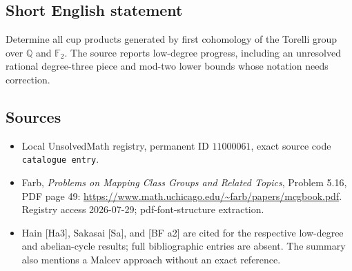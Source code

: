 \documentclass[11pt]{article}
\newcommand{\Q}{\mathbb{Q}}
\newcommand{\F}{\mathbb{F}}
\begin{document}
\subsection{Short English statement}
Determine all cup products generated by first cohomology of the Torelli group over \(\Q\) and \(\F_2\). The source reports low-degree progress, including an unresolved rational degree-three piece and mod-two lower bounds whose notation needs correction.
\subsection{Sources}
\begin{itemize}
\item Local UnsolvedMath registry, permanent ID \(11000061\), exact source code \texttt{catalogue entry}.
\item Farb, \emph{Problems on Mapping Class Groups and Related Topics}, Problem 5.16, PDF page 49: \url{https://www.math.uchicago.edu/~farb/papers/mcgbook.pdf}. Registry access 2026-07-29; pdf-font-structure extraction.
\item Hain [Ha3], Sakasai [Sa], and [BF a2] are cited for the respective low-degree and abelian-cycle results; full bibliographic entries are absent. The summary also mentions a Malcev approach without an exact reference.
\end{itemize}
\end{document}
